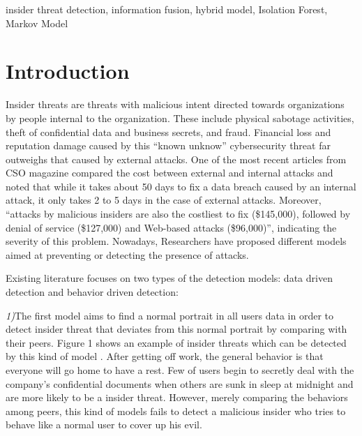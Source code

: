 \documentclass[conference]{IEEEtran}
\begin{document}
\begin{IEEEkeywords}
insider threat detection, information fusion, hybrid model, Isolation Forest, Markov Model
\end{IEEEkeywords}

\section{Introduction}

Insider threats are threats with malicious intent directed towards organizations by people internal to the organization.
These include physical sabotage activities, theft of confidential data and business secrets, and fraud. Financial loss and reputation damage caused by this ``known unknow'' cybersecurity threat far outweighs that caused by external attacks. One of the most recent articles from CSO magazine\cite{b3} compared the cost between external and internal attacks and noted that while it takes about 50 days to fix a data breach caused by an internal attack, it only takes 2 to 5 days in the case of external attacks. Moreover, “attacks by malicious insiders are also the costliest to fix (\$145,000), followed by denial of service (\$127,000) and Web-based attacks (\$96,000)”, indicating the severity of this problem. Nowadays, Researchers have proposed different models aimed at preventing or detecting the presence of attacks.

Existing literature focuses on two types of the detection 
models: data driven detection \cite{b4}\cite{b5} and behavior driven detection\cite{b2}\cite{b6}: 

\noindent \emph{1)}The first model aims to find a normal portrait in all users data in order to detect insider threat that deviates from  this normal portrait by comparing with their peers. Figure 1 shows an example of insider threats which can be detected by this kind of model \cite{b10}. After getting off work, the general behavior is that everyone will go home to have a rest. Few of users begin to secretly deal with the company's confidential documents when others are sunk in sleep at midnight and are more likely to be a insider threat. However, merely comparing the behaviors among peers,  this kind of models fails to detect a malicious insider who tries to behave like a normal user to cover up his evil\cite{b10}.
\end{document}
